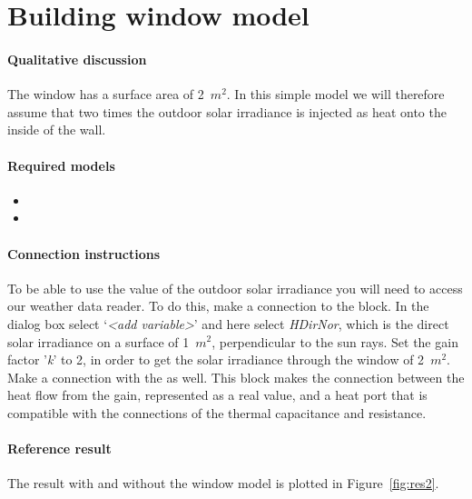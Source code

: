 \documentclass[10pt,a4paper]{article}
\begin{document}
\section{Building window model}
\paragraph{Qualitative discussion}
The window has a surface area of 2~$m^2$. 
In this simple model we will therefore assume that two times the
outdoor solar irradiance is injected as heat onto the inside of the wall.

\paragraph{Required models}
\begin{itemize}
\item {}
\item {}
\end{itemize}

\paragraph{Connection instructions}
To be able to use the value of the outdoor solar irradiance
you will need to access our weather data reader.
To do this, make a connection to the  block. 
In the dialog box select `\textit{\textless add variable\textgreater}' and here
select \textit{HDirNor}, 
which is the direct solar irradiance on a surface
of 1~$m^2$, perpendicular to the sun rays. Set the gain factor '\textit{k}' to 2, in order to get the solar irradiance through the window of 2~$m^2$. Make a connection with the  as well. This block makes the connection between the heat flow from the gain, represented as a real value, and a heat port that is compatible with the connections of the thermal capacitance and resistance. 

\paragraph{Reference result}
The result with and without the window model
is plotted in Figure~\ref{fig:res2}.
\end{document}
